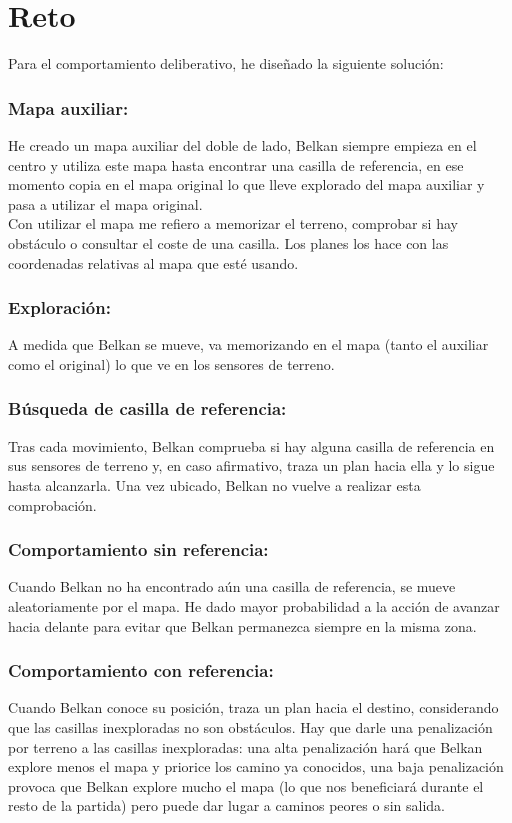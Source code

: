 \documentclass{article}
\begin{document}
\section{Reto}

Para el comportamiento deliberativo, he diseñado la siguiente solución:

\subsubsection*{Mapa auxiliar:}
He creado un mapa auxiliar del doble de lado, Belkan siempre empieza
en el centro y utiliza este mapa hasta encontrar una casilla de
referencia, en ese momento copia en el mapa original lo que lleve
explorado del mapa auxiliar y pasa a utilizar el mapa original. \\

Con utilizar el mapa me refiero a memorizar el terreno, comprobar si
hay obstáculo o consultar el coste de una casilla. Los planes los hace
con las coordenadas relativas al mapa que esté usando.


\subsubsection*{Exploración:}
A medida que Belkan se mueve, va memorizando en el mapa (tanto el
auxiliar como el original) lo que ve en los sensores de terreno.


\subsubsection*{Búsqueda de casilla de referencia:}
Tras cada movimiento, Belkan comprueba si hay alguna casilla de
referencia en sus sensores de terreno y, en caso afirmativo, traza un
plan hacia ella y lo sigue hasta alcanzarla. Una vez ubicado, Belkan
no vuelve a realizar esta comprobación.


\subsubsection*{Comportamiento sin referencia:}
Cuando Belkan no ha encontrado aún una casilla de referencia, se mueve
aleatoriamente por el mapa. He dado mayor probabilidad a la
acción de avanzar hacia delante para evitar que Belkan permanezca
siempre en la misma zona.


\subsubsection*{Comportamiento con referencia:}
Cuando Belkan conoce su posición, traza un plan hacia el destino,
considerando que las casillas inexploradas no son obstáculos. Hay que
darle una penalización por terreno a las casillas inexploradas: una
alta penalización hará que Belkan explore menos el mapa y priorice los
camino ya conocidos, una baja penalización provoca que Belkan explore
mucho el mapa (lo que nos beneficiará durante el resto de la partida)
pero puede dar lugar a caminos peores o sin salida.
\end{document}
